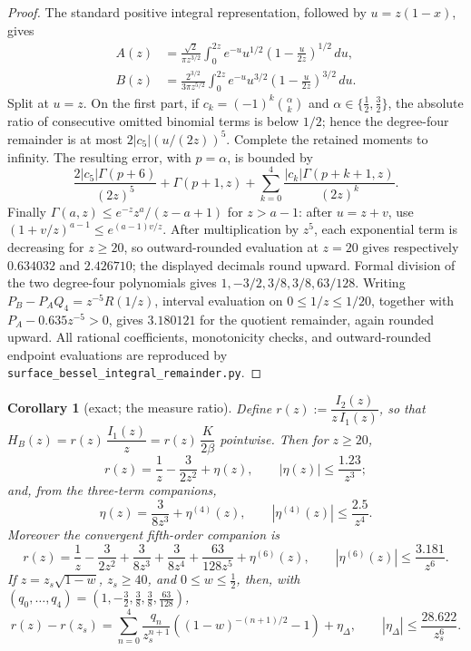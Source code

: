 \documentclass[11pt]{article}
\newtheorem{corollary}[theorem]{Corollary}
\theoremstyle{remark}
\begin{document}
\begin{proof}
The standard positive integral representation, followed by
$u=z(1-x)$, gives
\begin{align*}
A(z)&=\frac{\sqrt2}{\pi z^{3/2}}
\int_0^{2z}e^{-u}u^{1/2}\left(1-\frac{u}{2z}\right)^{1/2}\,du,\\
B(z)&=\frac{2^{3/2}}{3\pi z^{5/2}}
\int_0^{2z}e^{-u}u^{3/2}\left(1-\frac{u}{2z}\right)^{3/2}\,du.
\end{align*}
Split at $u=z$.  On the first part, if
$c_k=(-1)^k\binom\alpha k$ and $\alpha\in\{\tfrac12,\tfrac32\}$,
the absolute ratio of consecutive omitted binomial terms is below
$1/2$; hence the degree-four remainder is at most
$2|c_5|(u/(2z))^5$.  Complete the retained moments to infinity.
The resulting error, with $p=\alpha$, is bounded by
\[
 \frac{2|c_5|\Gamma(p+6)}{(2z)^5}
 +\Gamma(p+1,z)+\sum_{k=0}^4
 \frac{|c_k|\Gamma(p+k+1,z)}{(2z)^k}.
\]
Finally
$\Gamma(a,z)\le e^{-z}z^a/(z-a+1)$ for $z>a-1$:
after $u=z+v$, use
$(1+v/z)^{a-1}\le e^{(a-1)v/z}$.  After multiplication by $z^5$,
each exponential term is decreasing for $z\ge20$, so outward-rounded
evaluation at $z=20$ gives respectively $0.634032$ and $2.426710$;
the displayed decimals round upward.  Formal division of the two
degree-four polynomials gives
$1,-3/2,3/8,3/8,63/128$.  Writing
$P_B-P_AQ_4=z^{-5}R(1/z)$, interval evaluation on
$0\le1/z\le1/20$, together with
$P_A-0.635z^{-5}>0$, gives $3.180121$ for the quotient remainder,
again rounded upward.  All rational coefficients, monotonicity checks,
and outward-rounded endpoint evaluations are reproduced by
\texttt{surface\_bessel\_integral\_remainder.py}.
\end{proof}

\begin{corollary}[exact; the measure ratio]\label{cor:mratio}
Define $r(z):=\dfrac{I_2(z)}{z\,I_1(z)}$, so that
$H_B(z)=r(z)\,\dfrac{I_1(z)}{z}=r(z)\,\dfrac{K}{2\beta}$ pointwise.
Then for $z\ge20$,
\[
r(z)=\frac1z-\frac{3}{2z^2}+\eta(z),\qquad
|\eta(z)|\le\frac{1.23}{z^{3}} ;
\]
and, from the three-term companions,
\[
\eta(z)=\frac{3}{8z^3}+\eta^{(4)}(z),\qquad
|\eta^{(4)}(z)|\le\frac{2.5}{z^4} .
\]
Moreover the convergent fifth-order companion is
\[
r(z)=\frac1z-\frac3{2z^2}+\frac3{8z^3}+\frac3{8z^4}
+\frac{63}{128z^5}+\eta^{(6)}(z),\qquad
|\eta^{(6)}(z)|\le\frac{3.181}{z^6}.
\]
If $z=z_s\sqrt{1-w}$, $z_s\ge40$, and $0\le w\le\tfrac12$, then,
with $(q_0,\ldots,q_4)=(1,-\tfrac32,\tfrac38,\tfrac38,
\tfrac{63}{128})$,
\[
 r(z)-r(z_s)=\sum_{n=0}^4\frac{q_n}{z_s^{n+1}}
 \left((1-w)^{-(n+1)/2}-1\right)+\eta_\Delta,
 \qquad |\eta_\Delta|\le\frac{28.622}{z_s^6}.
\]
\end{corollary}
\end{document}
